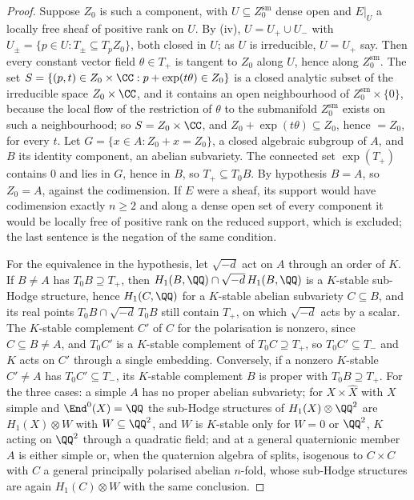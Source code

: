 \begin{proof}
Suppose $Z_{0}$ is such a component, with $U\subseteq Z_{0}^{\mathrm{sm}}$ dense
open and $E|_{U}$ a locally free sheaf of positive rank on $U$. By
(iv), $U=U_{+}\cup U_{-}$ with
$U_{\pm}=\{p\in U:T_{\pm}\subseteq T_{p}Z_{0}\}$, both closed in $U$; as $U$
is irreducible, $U=U_{+}$ say. Then every constant vector field
$\theta\in T_{+}$ is tangent to $Z_{0}$ along $U$, hence along
$Z_{0}^{\mathrm{sm}}$. The set
$S=\{(p,t)\in Z_{0}\times\CC:p+\exp(t\theta)\in Z_{0}\}$ is a closed
analytic subset of the irreducible space $Z_{0}\times\CC$, and it contains
an open neighbourhood of $Z_{0}^{\mathrm{sm}}\times\{0\}$, because the local
flow of the restriction of $\theta$ to the submanifold $Z_{0}^{\mathrm{sm}}$
exists on such a neighbourhood; so $S=Z_{0}\times\CC$, and
$Z_{0}+\exp(t\theta)\subseteq Z_{0}$, hence $=Z_{0}$, for every $t$. Let
$G=\{x\in A:Z_{0}+x=Z_{0}\}$, a closed algebraic subgroup of $A$, and $B$
its identity component, an abelian subvariety. The connected set
$\exp(T_{+})$ contains $0$ and lies in $G$, hence in $B$, so
$T_{+}\subseteq T_{0}B$. By hypothesis $B=A$, so $Z_{0}=A$, against the
codimension. If $E$ were a sheaf, its support would have codimension exactly
$n\ge2$ and along a dense open set of every component it would be locally
free of positive rank on the reduced support, which is excluded; the last
sentence is the negation of the same condition.

For the equivalence in the hypothesis, let $\sqrt{-d}$ act on $A$ through
an order of $K$. If $B\ne A$ has $T_{0}B\supseteq T_{+}$, then
$H_{1}(B,\QQ)\cap\sqrt{-d}\,H_{1}(B,\QQ)$ is a $K$-stable sub-Hodge
structure, hence $H_{1}(C,\QQ)$ for a $K$-stable abelian subvariety
$C\subseteq B$, and its real points $T_{0}B\cap\sqrt{-d}\,T_{0}B$ still
contain $T_{+}$, on which $\sqrt{-d}$ acts by a scalar. The $K$-stable
complement $C'$ of $C$ for the polarisation is nonzero, since $C\subseteq B\ne A$,
and $T_{0}C'$ is a $K$-stable complement of $T_{0}C\supseteq T_{+}$, so
$T_{0}C'\subseteq T_{-}$ and $K$ acts on $C'$ through a single embedding.
Conversely, if a nonzero $K$-stable $C'\ne A$ has $T_{0}C'\subseteq T_{-}$,
its $K$-stable complement $B$ is proper with $T_{0}B\supseteq T_{+}$. For the
three cases: a simple $A$ has no proper abelian subvariety; for
$X\times\widehat X$ with $X$ simple and $\End^{0}(X)=\QQ$ the sub-Hodge
structures of $H_{1}(X)\otimes\QQ^{2}$ are $H_{1}(X)\otimes W$ with
$W\subseteq\QQ^{2}$, and $W$ is $K$-stable only for $W=0$ or $\QQ^{2}$, $K$
acting on $\QQ^{2}$ through a quadratic field; and at a general quaternionic
member $A$ is either simple or, when the quaternion algebra of
 splits, isogenous to $C\times C$ with $C$ a general
principally polarised abelian $n$-fold, whose sub-Hodge structures are again
$H_{1}(C)\otimes W$ with the same conclusion.
\end{proof}

